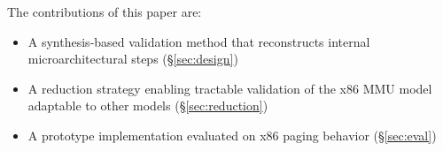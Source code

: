 % 
%
The contributions of this paper are:
\begin{itemize}[topsep=0pt, leftmargin=1.5em]
\item A synthesis-based validation method that reconstructs internal microarchitectural steps (\S\ref{sec:design})
\item A reduction strategy enabling tractable validation of the x86 MMU model adaptable to other models (\S\ref{sec:reduction})
\item A prototype implementation evaluated on x86 paging behavior (\S\ref{sec:eval})
\end{itemize}

 